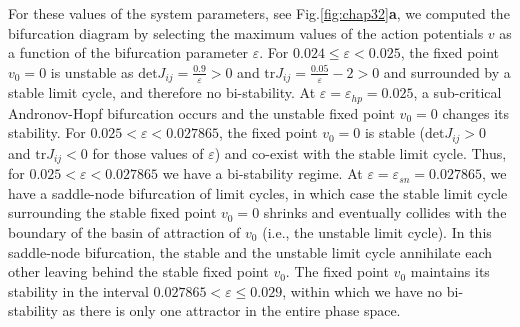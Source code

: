 For these values of the system
parameters, see Fig.\ref{fig:chap32}\textbf{a}, we computed the
bifurcation diagram by selecting the maximum values
of the action potentials $v$ as a function of the bifurcation
parameter $\varepsilon$. For $0.024\leq\varepsilon<0.025$, the fixed
point $v_0=0$ is unstable as $\mathrm{det}J_{ij}=\frac{0.9}{\varepsilon}>0$ and
$\mathrm{tr}J_{ij}=\frac{0.05}{\varepsilon}-2>0$ and surrounded by a stable
limit cycle, and therefore no bi-stability. At
$\varepsilon=\varepsilon_{hp}=0.025$, a sub-critical Andronov-Hopf bifurcation
occurs and the unstable fixed point $v_0=0$ changes its stability.
For $0.025<\varepsilon<0.027865$, the fixed point $v_0=0$ is stable ($\mathrm{det}J_{ij}>0$
and $\mathrm{tr}J_{ij}<0$ for those values of $\varepsilon$) and co-exist with
the stable limit cycle. Thus, for $0.025<\varepsilon<0.027865$ we have a
bi-stability regime. At $\varepsilon=\varepsilon_{sn}=0.027865$, we have a
saddle-node bifurcation of limit cycles, in which case the stable
limit cycle surrounding the stable fixed point $v_0=0$ shrinks and eventually 
collides with the boundary of the basin of attraction
of $v_0$ (i.e., the unstable limit cycle). In this saddle-node bifurcation, 
the stable and the unstable limit cycle
annihilate each other leaving behind the stable fixed point $v_0$.
The fixed point $v_0$ maintains its stability in the interval
$0.027865<\varepsilon\leq0.029$, within which we have no
bi-stability as there is only one attractor in the entire phase space.

